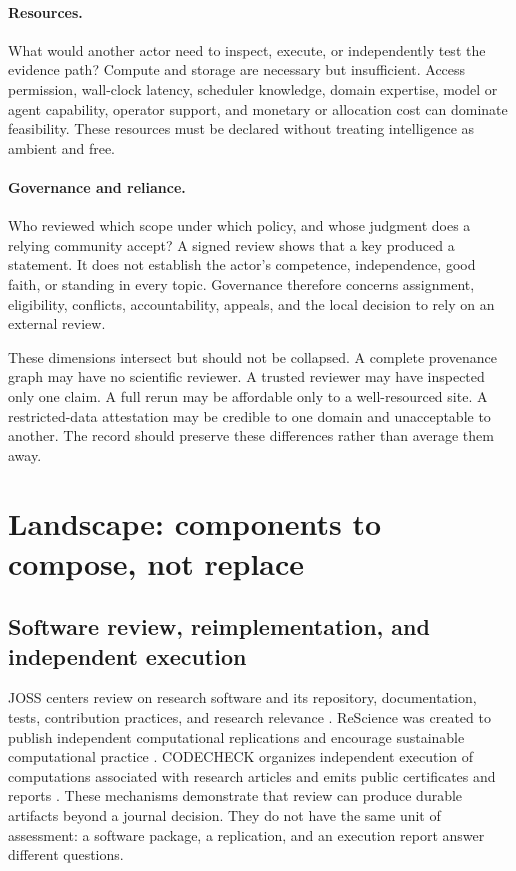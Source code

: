 \documentclass[11pt]{article}
\begin{document}
\paragraph{Resources.} What would another actor need to inspect, execute, or independently test the evidence path? Compute and storage are necessary but insufficient. Access permission, wall-clock latency, scheduler knowledge, domain expertise, model or agent capability, operator support, and monetary or allocation cost can dominate feasibility. These resources must be declared without treating intelligence as ambient and free.

\paragraph{Governance and reliance.} Who reviewed which scope under which policy, and whose judgment does a relying community accept? A signed review shows that a key produced a statement. It does not establish the actor's competence, independence, good faith, or standing in every topic. Governance therefore concerns assignment, eligibility, conflicts, accountability, appeals, and the local decision to rely on an external review.

These dimensions intersect but should not be collapsed. A complete provenance graph may have no scientific reviewer. A trusted reviewer may have inspected only one claim. A full rerun may be affordable only to a well-resourced site. A restricted-data attestation may be credible to one domain and unacceptable to another. The record should preserve these differences rather than average them away.

\section{Landscape: components to compose, not replace}
\label{sec:landscape}

\subsection{Software review, reimplementation, and independent execution}

JOSS centers review on research software and its repository, documentation, tests, contribution practices, and research relevance \citep{smith-joss-2018}. ReScience was created to publish independent computational replications and encourage sustainable computational practice \citep{rougier-rescience-2017}. CODECHECK organizes independent execution of computations associated with research articles and emits public certificates and reports \citep{nust-codecheck-2021}. These mechanisms demonstrate that review can produce durable artifacts beyond a journal decision. They do not have the same unit of assessment: a software package, a replication, and an execution report answer different questions.
\end{document}
